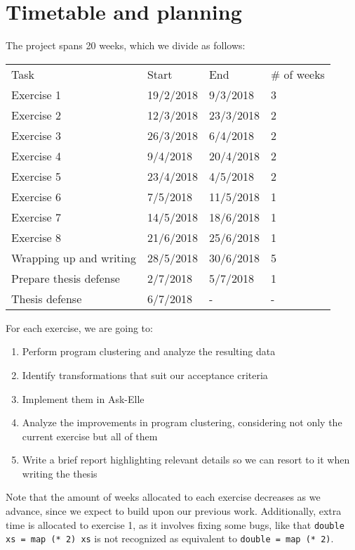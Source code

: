 \chapter{Timetable and planning}

The project spans 20 weeks, which we divide as follows:

\begin{tabular}{l l l l}
    Task                    & Start     & End       & \# of weeks \\
    Exercise 1              & 19/2/2018 & 9/3/2018  & 3          \\
    Exercise 2              & 12/3/2018 & 23/3/2018 & 2          \\
    Exercise 3              & 26/3/2018 & 6/4/2018  & 2          \\
    Exercise 4              & 9/4/2018  & 20/4/2018 & 2          \\
    Exercise 5              & 23/4/2018 & 4/5/2018  & 2          \\
    Exercise 6              & 7/5/2018  & 11/5/2018 & 1          \\
    Exercise 7              & 14/5/2018 & 18/6/2018 & 1          \\
    Exercise 8              & 21/6/2018 & 25/6/2018 & 1          \\
    Wrapping up and writing & 28/5/2018 & 30/6/2018 & 5          \\
    Prepare thesis defense  & 2/7/2018  & 5/7/2018  & 1          \\
    Thesis defense          & 6/7/2018  & -         & -
\end{tabular}

For each exercise, we are going to:

\begin{enumerate}
    \item Perform program clustering and analyze the resulting data
    \item Identify transformations that suit our acceptance criteria
    \item Implement them in Ask-Elle
    \item Analyze the improvements in program clustering, considering not only the current exercise but all of them
    \item Write a brief report highlighting relevant details so we can resort to it when writing the thesis
\end{enumerate}

Note that the amount of weeks allocated to each exercise decreases as we advance, since we expect to build upon our previous work. Additionally, extra time is allocated to exercise 1, as it involves fixing some bugs, like that \texttt{double xs = map (* 2) xs} is not recognized as equivalent to \texttt{double = map (* 2)}.
